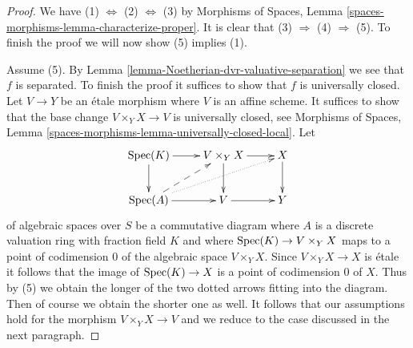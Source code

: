 \begin{proof}
We have (1) $\Leftrightarrow$ (2) $\Leftrightarrow$ (3) by 
Morphisms of Spaces, Lemma \ref{spaces-morphisms-lemma-characterize-proper}.
It is clear that (3) $\Rightarrow$ (4) $\Rightarrow$ (5).
To finish the proof we will now show (5) implies (1).

\medskip\noindent
Assume (5). By Lemma \ref{lemma-Noetherian-dvr-valuative-separation}
we see that $f$ is separated. To finish the proof it suffices to show
that $f$ is universally closed. Let $V \to Y$ be an \'etale morphism
where $V$ is an affine scheme. It suffices to show that the base
change $V \times_Y X \to V$ is universally closed, see
Morphisms of Spaces, Lemma
\ref{spaces-morphisms-lemma-universally-closed-local}.
Let
$$
\xymatrix{
\Spec(K) \ar[r] \ar[d] & V \times_Y X \ar[d] \ar[r] & X \ar[d] \\
\Spec(A) \ar[r] \ar@{-->}[ru] \ar@{..>}[rru] & V \ar[r] & Y
}
$$
of algebraic spaces over $S$
be a commutative diagram where $A$ is a discrete valuation ring
with fraction field $K$ and where $\mathop{\mathrm{Spec}}(K) \to V \times_Y X$
maps to a point of codimension $0$ of the algebraic space
$V \times_Y X$. Since $V \times_Y X \to X$ is \'etale it follows
that the image of $\mathop{\mathrm{Spec}}(K) \to X$ is a point of codimension $0$
of $X$. Thus by (5) we obtain the longer of the two dotted
arrows fitting into the diagram. Then of course we obtain the
shorter one as well. It follows that our assumptions hold for
the morphism $V \times_Y X \to V$ and we reduce to the case discussed
in the next paragraph.


\end{proof}
